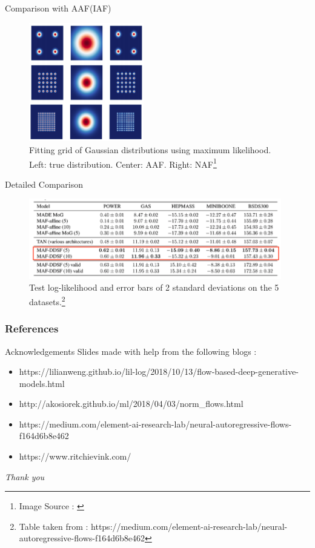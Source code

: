 \documentclass{beamer}
\begin{document}
\begin{frame}{Comparison with AAF(IAF)}
\begin{figure}
    \centering
    \includegraphics[width=50mm,scale=0.5]{naf-result.png}
    \caption{Fitting grid of Gaussian distributions using maximum
likelihood. Left: true distribution. Center: AAF. Right: NAF\footnote{Image Source : \cite{huang2018neural}}}
    \label{fig:naf-result}
\end{figure}
\end{frame}

\begin{frame}{Detailed Comparison}
\begin{figure}
    \centering
    \includegraphics[width=110mm]{naf-table.png}
    \caption{Test log-likelihood and error bars of 2 standard deviations on the 5 datasets.\footnote{Table taken from : https://medium.com/element-ai-research-lab/neural-autoregressive-flows-f164d6b8e462}}
    \label{fig:my_label}
\end{figure}
    
\end{frame}
\begin{frame}[allowframebreaks]
\frametitle{References}



\end{frame}
\begin{frame}{Acknowledgements}
    Slides made with help from the following blogs :
    \begin{itemize}
        \item https://lilianweng.github.io/lil-log/2018/10/13/flow-based-deep-generative-models.html
        \item http://akosiorek.github.io/ml/2018/04/03/norm\_flows.html
        \item https://medium.com/element-ai-research-lab/neural-autoregressive-flows-f164d6b8e462
        \item https://www.ritchievink.com/
    \end{itemize}
\end{frame}

\begin{frame}{}
  \centering \LARGE
  \emph{Thank you}
\end{frame}
\end{document}
